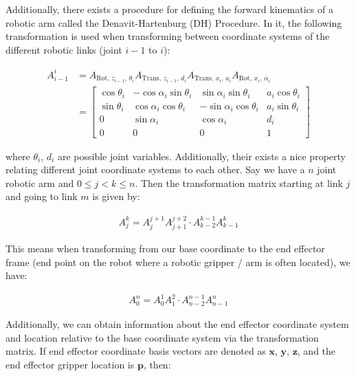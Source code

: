 \documentclass{article}
\begin{document}
    Additionally, there exists a procedure for defining the forward kinematics of a robotic arm
    called the Denavit-Hartenburg (DH) Procedure. In it, the following transformation is used
    when transforming between coordinate systems of the different robotic links
    (joint $i - 1$ to $i$):
    
    \begin{align*}
        A_{i - 1}^{i} &= A_{\text{Rot, }z_{i - 1}\text{, } \theta_{i}} A_{\text{Trans, }z_{i - 1}\text{, } d_{i}} A_{\text{Trans, }x_{i}\text{, } a_{i}} A_{\text{Rot, }x_{i}\text{, } \alpha_{i}} \\
                      &=
        \begin{bmatrix}
            \cos \theta_{i} & -\cos \alpha_{i} \sin \theta_{i} &  \sin \alpha_{i} \sin \theta_{i} & a_{i} \cos \theta_{i} \\
            \sin \theta_{i} &  \cos \alpha_{i} \cos \theta_{i} & -\sin \alpha_{i} \cos \theta_{i} & a_{i} \sin \theta_{i} \\
            0               &  \sin \alpha_{i}                 &  \cos \alpha_{i}                 & d_{i}                 \\
            0               &  0                               &  0                               & 1
        \end{bmatrix}
    \end{align*}
    
    where $\theta_{i}$, $d_{i}$ are possible joint variables. Additionally, their exists a nice
    property relating different joint coordinate systems to each other. Say we have a $n$ joint
    robotic arm and $0 \leq j < k \leq n$. Then the transformation matrix starting at link $j$ and
    going to link $m$ is given by:
    
    \begin{align*}
        A_{j}^{k} = A_{j}^{j + 1} A_{j + 1}^{j + 2} \cdot A_{k - 2}^{k - 1} A_{k - 1}^{k}
    \end{align*}
    
    This means when transforming from our base coordinate to the end effector frame (end point
    on the robot where a robotic gripper / arm is often located), we have:
    
    \begin{align*}
        A_{0}^{n} = A_{0}^{1} A_{1}^{2} \cdot A_{n - 2}^{n - 1} A_{n - 1}^{n}
    \end{align*}
    
    Additionally, we can obtain information about the end effector coordinate system and location
    relative to the base coordinate system via the transformation matrix. If end effector
    coordinate basis vectors are denoted as $\textbf{x}$, $\textbf{y}$, $\textbf{z}$, and the
    end effector gripper location is $\textbf{p}$, then:
    
\end{document}
